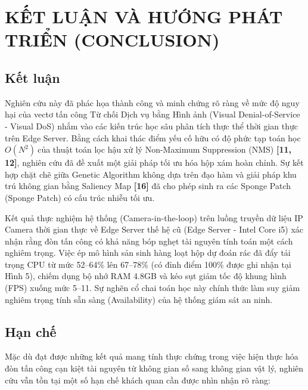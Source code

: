 \documentclass[a4paper,fleqn]{cas-dc}
\begin{document}
\section{KẾT LUẬN VÀ HƯỚNG PHÁT TRIỂN (CONCLUSION)}



\subsection{Kết luận}



Nghiên cứu này đã phác họa thành công và minh chứng rõ ràng về mức độ
nguy hại của vectơ tấn công Từ chối Dịch vụ bằng Hình ảnh (Visual
Denial-of-Service - Visual DoS) nhắm vào các kiến trúc học sâu phân tích
thực thể thời gian thực trên Edge Server. Bằng cách khai thác điểm yếu
cố hữu có độ phức tạp toán học \(O\left( N^{2} \right)\ \)của thuật toán
lọc hậu xử lý Non-Maximum Suppression (NMS) \textbf{{[}11, 12{]}},
nghiên cứu đã đề xuất một giải pháp tối ưu hóa hộp xám hoàn chỉnh. Sự
kết hợp chặt chẽ giữa Genetic Algorithm không dựa trên đạo hàm và giải
pháp khu trú không gian bằng Saliency Map \textbf{{[}16{]}} đã cho phép
sinh ra các Sponge Patch (Sponge Patch) có cấu trúc nhiễu tối ưu.

Kết quả thực nghiệm hệ thống (Camera-in-the-loop) trên luồng truyền dữ
liệu IP Camera thời gian thực về Edge Server thế hệ cũ (Edge Server -
Intel Core i5) xác nhận rằng đòn tấn công có khả năng bóp nghẹt tài
nguyên tính toán một cách nghiêm trọng. Việc ép mô hình sản sinh hàng
loạt hộp dự đoán rác đã đẩy tải trọng CPU từ mức 52--64\% lên 67--78\%
(có đỉnh điểm 100\% được ghi nhận tại Hình 5), chiếm dụng bộ nhớ RAM
4.8GB và kéo sụt giảm tốc độ khung hình (FPS) xuống mức 5--11. Sự nghẽn
cổ chai toán học này chính thức làm suy giảm nghiêm trọng tính sẵn sàng
(Availability) của hệ thống giám sát an ninh.

\subsection{Hạn chế}



Mặc dù đạt được những kết quả mang tính thực chứng trong việc hiện thực
hóa đòn tấn công cạn kiệt tài nguyên từ không gian số sang không gian
vật lý, nghiên cứu vẫn tồn tại một số hạn chế khách quan cần được nhìn
nhận rõ ràng:
\end{document}
